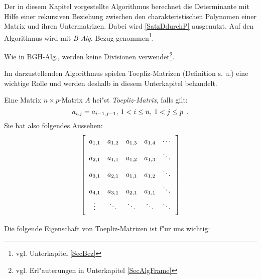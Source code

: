 %
%
\label{ChapBerk}

Der in diesem Kapitel vorgestellte Algorithmus \cite{Berk84} berechnet
die Determinante mit Hilfe einer rekursiven Beziehung zwischen den
charakteristischen Polynomen einer Matrix und ihren Untermatrizen. Dabei
wird \ref{SatzDdurchP} ausgenutzt. Auf den Algorithmus wird mit {\em B-Alg.} Bezug
genommen\footnote{vgl. Unterkapitel \ref{SecBez}}. 

Wie in BGH-Alg., werden keine Divisionen
verwendet\footnote{vgl. Erl"auterungen in Unterkapitel \ref{SecAlgFrame}}.



Im darzustellenden Algorithmus spielen Toepliz-Matrizen (Definition s. u.)
eine wichtige Rolle und werden deshalb in diesem Unterkapitel behandelt.

Eine Matrix $n \times p$-Matrix $A$ hei"st {\em Toepliz-Matrix}, falls
gilt: 
\[ a_{i,j} = a_{i-1,j-1} , \: 1 < i \leq n, \: 1 < j \leq p \mbox{\hspace{0.5em}.} \]
Sie hat also folgendes Aussehen:
\[
   \left[ \begin{array}{ccccc}
       a_{1,1} & a_{1,2} & a_{1,3} & a_{1,4} & \cdots \MatStrut \\
       a_{2,1} & a_{1,1} & a_{1,2} & a_{1,3} & \ddots \MatStrut \\
       a_{3,1} & a_{2,1} & a_{1,1} & a_{1,2} & \ddots \MatStrut \\
       a_{4,1} & a_{3,1} & a_{2,1} & a_{1,1} & \ddots \MatStrut \\
       \vdots  & \ddots  & \ddots  & \ddots  & \ddots \MatStrut
   \end{array} \right]
\]

Die folgende Eigenschaft von Toepliz-Matrizen ist f"ur uns wichtig:

